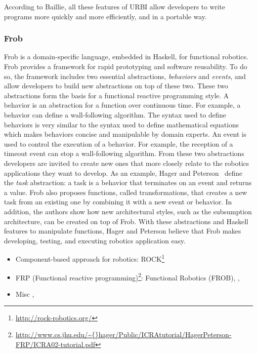 According to Baillie, all these features of URBI allow developers to
write programs more quickly and more efficiently, and in a portable way.

\subsubsection{Frob}

Frob is a domain-specific language, embedded in Haskell, for
functional robotics\cite{Hager:1999fk}. Frob provides a framework for
rapid prototyping and software reusability. To do so, the framework
includes two essential abstractions, \emph{behaviors} and
\emph{events}, and allow developers to build new abstractions on top
of these two. These two abstractions form the basis for a functional
reactive programming style. A behavior is an abstraction for a
function over continuous time. For example, a behavior can define a
wall-following algorithm. The syntax used to define behaviors is very
similar to the syntax used to define mathematical equations which
makes behaviors concise and manipulable by domain experts. An event is
used to control the execution of a behavior. For example, the
reception of a timeout event can stop a wall-following algorithm. From
these two abstractions developers are invited to create new ones that
more closely relate to the robotics applications they want to develop.
As an example, Hager and Peterson~\cite{Peterson:1999lk} define the
\emph{task} abstraction: a task is a behavior that terminates on an
event and returns a value. Frob also proposes functions, called
transformations, that creates a new task from an existing one by
combining it with a new event or behavior. In addition, the authors
show how new architectural styles, such as the subsumption
architecture, can be created on top of Frob. With these abstractions
and Haskell features to manipulate functions, Hager and Peterson
believe that Frob makes developing, testing, and executing robotics
application easy.



\begin{itemize}
\item Component-based approach for robotics: 
  ROCK\footnote{\url{http://rock-robotics.org/}} \cite{Joyeux:2011fk}
\item FRP (Functional reactive
  programming)\footnote{\url{http://www.cs.jhu.edu/\~{}hager/Public/ICRAtutorial/HagerPeterson-FRP/ICRA02-tutorial.pdf}}:
  Functional Robotics (FROB)\cite{Hager:1999fk},
  \cite{Peterson:1999lk}, \cite{Pembeci:2002fc}
\item Misc \cite{Thiry:2008ys}, \cite{Proetzsch:2010vn}
\end{itemize}

